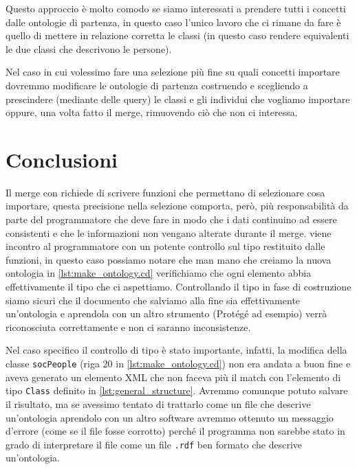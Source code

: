 Questo approccio è molto comodo se siamo interessati a prendere tutti i concetti dalle ontologie di partenza, in questo caso l'unico lavoro che ci rimane da fare è quello di mettere in relazione corretta le classi (in questo caso rendere equivalenti le due classi che descrivono le persone). 

Nel caso in cui volessimo fare una selezione più fine su quali concetti importare dovremmo modificare le ontologie di partenza costruendo e scegliendo a prescindere (mediante delle query) le classi e gli individui che vogliamo importare oppure, una volta fatto il merge, rimuovendo ciò che non ci interessa.
\section{Conclusioni}
Il merge con \cduce richiede di scrivere funzioni che permettano di selezionare cosa importare, questa precisione nella selezione comporta, però, più responsabilità da parte del programmatore che deve fare in modo che i dati continuino ad essere consistenti e che le informazioni non vengano alterate durante il merge. \cduce viene incontro al programmatore con un potente controllo sul tipo restituito dalle funzioni, in questo caso possiamo notare che man mano che creiamo la nuova ontologia in \ref{lst:make_ontology.cd} verifichiamo che ogni elemento abbia effettivamente il tipo che ci aspettiamo. Controllando il tipo in fase di costruzione siamo sicuri che il documento che salviamo alla fine sia effettivamente un'ontologia e aprendola con un altro strumento (Protégé ad esempio) verrà riconosciuta correttamente e non ci saranno inconsistenze.

Nel caso specifico il controllo di tipo è stato importante, infatti, la modifica della classe \verb|socPeople| (riga 20 in \ref{lst:make_ontology.cd}) non era andata a buon fine e aveva generato un elemento XML che non faceva più il match con l'elemento di tipo \verb|Class| definito in \ref{lst:general_structure}. Avremmo comunque potuto salvare il risultato, ma se avessimo tentato di trattarlo come un file che descrive un'ontologia aprendolo con un altro software avremmo ottenuto un messaggio d'errore (come se il file fosse corrotto) perché il programma non sarebbe stato in grado di interpretare il file come un file \verb|.rdf| ben formato che descrive un'ontologia.


